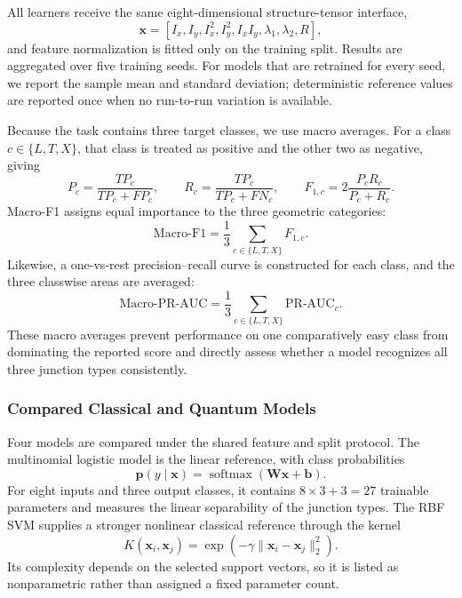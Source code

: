 \documentclass[11pt]{article}
\begin{document}
All learners receive the same eight-dimensional structure-tensor interface,
\begin{equation}
    \mathbf{x}=
    [I_x,I_y,I_x^2,I_y^2,I_xI_y,\lambda_1,\lambda_2,R],
\end{equation}
and feature normalization is fitted only on the training split. Results are
aggregated over five training seeds. For models that are retrained for every
seed, we report the sample mean and standard deviation; deterministic reference
values are reported once when no run-to-run variation is available.

Because the task contains three target classes, we use macro averages. For a
class $c\in\{L,T,X\}$, that class is treated as
positive and the other two as negative, giving
\begin{equation}
    P_c=\frac{TP_c}{TP_c+FP_c},
    \qquad
    R_c=\frac{TP_c}{TP_c+FN_c},
    \qquad
    F_{1,c}=2\frac{P_cR_c}{P_c+R_c}.
\end{equation}
Macro-F1 assigns equal importance to the three geometric categories:
\begin{equation}
    \mathrm{Macro\mbox{-}F1}
    =\frac{1}{3}\sum_{c\in\{L,T,X\}}F_{1,c}.
\end{equation}
Likewise, a one-vs-rest precision--recall curve is constructed for each class,
and the three classwise areas are averaged:
\begin{equation}
    \mathrm{Macro\mbox{-}PR\mbox{-}AUC}
    =\frac{1}{3}\sum_{c\in\{L,T,X\}}
    \mathrm{PR\mbox{-}AUC}_c.
\end{equation}
These macro averages prevent performance on one comparatively easy class from
dominating the reported score and directly assess whether a model recognizes
all three junction types consistently.

\subsubsection{Compared Classical and Quantum Models}

Four models are compared under the shared feature and split protocol. The
multinomial logistic model is the linear reference, with class probabilities
\begin{equation}
    \mathbf{p}(y\mid\mathbf{x})
    =\operatorname{softmax}(\mathbf{W}\mathbf{x}+\mathbf{b}).
\end{equation}
For eight inputs and three output classes, it contains
$8\times3+3=27$ trainable parameters and measures the linear separability of
the junction types. The RBF SVM supplies a stronger nonlinear classical
reference through the kernel
\begin{equation}
    K(\mathbf{x}_i,\mathbf{x}_j)
    =\exp\!\left(-\gamma\lVert\mathbf{x}_i-\mathbf{x}_j\rVert_2^2\right).
\end{equation}
Its complexity depends on the selected support vectors, so it is listed as
nonparametric rather than assigned a fixed parameter count.
\end{document}

